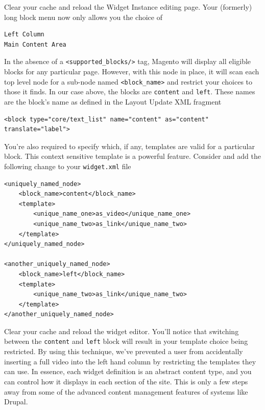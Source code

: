 \documentclass[oneside]{book}
\begin{document}
Clear your cache and reload the Widget Instance editing page.  Your (formerly) long block menu now only allows you the choice of 

\begin{lstlisting}
Left Column
Main Content Area

\end{lstlisting}


In the absence of a \footnotesize\texttt{\textless supported\_blocks/\textgreater } \normalsize  tag, Magento will display all eligible blocks for any particular page.  However, with this node in place, it will scan each top level node for a sub-node named \footnotesize\texttt{\textless block\_name\textgreater } \normalsize  and restrict your choices to those it finds.  In our case above, the blocks are \footnotesize\texttt{content} \normalsize  and \footnotesize\texttt{left}\normalsize.  These names are the block's name as defined in the Layout Update XML fragment

\begin{lstlisting}
<block type="core/text_list" name="content" as="content" translate="label">

\end{lstlisting}


You're also required to specify which, if any, templates are valid for a particular block.  This context sensitive template is a powerful feature.  Consider and add the following change to your \footnotesize\texttt{widget.xml} \normalsize  file

\begin{lstlisting}
<uniquely_named_node>
    <block_name>content</block_name>
    <template>
        <unique_name_one>as_video</unique_name_one>
        <unique_name_two>as_link</unique_name_two>
    </template>
</uniquely_named_node>

<another_uniquely_named_node>
    <block_name>left</block_name>
    <template>
        <unique_name_two>as_link</unique_name_two>
    </template>
</another_uniquely_named_node>

\end{lstlisting}


Clear your cache and reload the widget editor.  You'll notice that switching between the \footnotesize\texttt{content} \normalsize  and \footnotesize\texttt{left} \normalsize  block will result in your template choice being restricted.  By using this technique, we've prevented a user from accidentally inserting a full video into the left hand column by restricting the templates they can use.  In essence, each widget definition is an abstract content type, and you can control how it displays in each section of the site.  This is only a few steps away from some of the advanced content management features of systems like Drupal.
\end{document}
